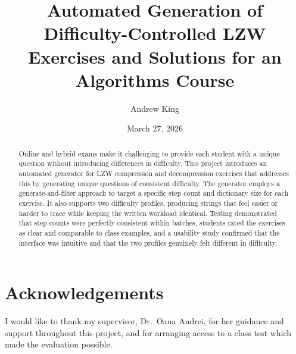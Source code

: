 \documentclass{l4proj}
\begin{document}
\title{Automated Generation of Difficulty-Controlled LZW Exercises and Solutions for an Algorithms Course}
\author{Andrew King}
\date{March 27, 2026}

\maketitle

\begin{abstract}
Online and hybrid exams make it challenging to provide each student with a unique question without introducing differences in difficulty. This project introduces an automated generator for LZW compression and decompression exercises that addresses this by generating unique questions of consistent difficulty. The generator employs a generate-and-filter approach to target a specific step count and dictionary size for each exercise. It also supports two difficulty profiles, producing strings that feel easier or harder to trace while keeping the written workload identical. Testing demonstrated that step counts were perfectly consistent within batches, students rated the exercises as clear and comparable to class examples, and a usability study confirmed that the interface was intuitive and that the two profiles genuinely felt different in difficulty.
\end{abstract}

\chapter*{Acknowledgements}
I would like to thank my supervisor, Dr.\ Oana Andrei, for her guidance and support throughout this project, and for arranging access to a class test which made the evaluation possible.



%
%
%
\educationalconsent
\end{document}
